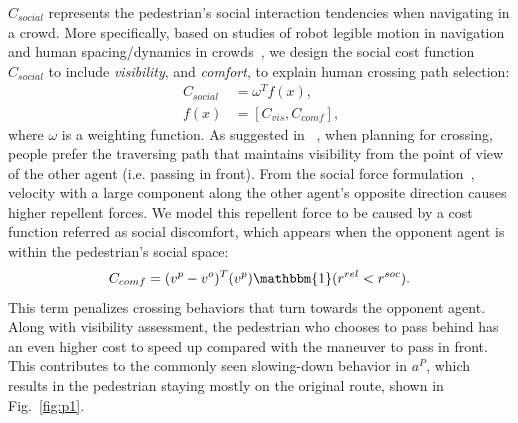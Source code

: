 \documentclass[conference]{IEEEtran}
\begin{document}
$C_{social}$ represents the pedestrian's social interaction tendencies when 
navigating in a crowd. More specifically, based on
studies of robot legible motion in 
navigation~\cite{kruse2012legible,lichtenthaler2012influence} and human 
spacing/dynamics in crowds~\cite{helbing1995social,hall1966hidden}, we design 
the social cost function $C_{social}$ to include \textit{visibility}, and \textit{comfort}, 
to explain human crossing path selection:
\begin{equation}~\label{eq:social_cost}
  \begin{aligned}
    C_{social} &= \omega^T f(x), \\
    f(x) &= [C_{vis}, C_{comf}],
  \end{aligned}
\end{equation}
where $\omega$ is a weighting function.
As suggested in ~\cite{kruse2012legible}, when planning for crossing, people 
prefer the traversing path that maintains visibility from the point of view of 
the other agent (i.e. passing in front).
From the social force formulation~\cite{helbing1995social}, velocity with a 
large component along the other agent's opposite direction 
causes higher repellent forces.
We model this repellent force to be caused by a cost function referred
as social discomfort, 
which appears when the opponent agent is within the pedestrian's social space:
\begin{equation}
  C_{comf} = (v^p-v^o)^T (v^p) \mathbbm{1}(r^{rel}<r^{soc}).
\end{equation}
This term penalizes crossing behaviors that turn towards the opponent agent. 
Along with visibility assessment, the pedestrian who chooses to pass 
behind has an even higher cost to speed up compared with the maneuver to pass 
in front. This contributes to the commonly seen slowing-down behavior in $a^P$, 
which results in the pedestrian staying mostly on the original route, 
shown in Fig.~\ref{fig:p1}.
\end{document}
